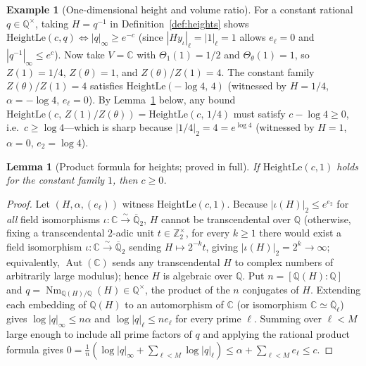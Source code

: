 \documentclass[11pt]{amsart}
\newcommand{\CC}{\mathbb{C}}
\newcommand{\QQ}{\mathbb{Q}}
\newcommand{\ZZ}{\mathbb{Z}}
\newcommand{\Nm}{\operatorname{Nm}}
\newtheorem{lemma}[theorem]{Lemma}
\theoremstyle{definition}
\newtheorem{example}[theorem]{Example}
\theoremstyle{remark}
\begin{document}
\begin{example}[One-dimensional height and volume ratio]\label{ex:height_toy}
For a constant rational $q\in\QQ^\times$, taking $H=q^{-1}$ in Definition~\ref{def:heights} shows $\mathrm{HeightLe}(c,q)\iff |q|_\infty\ge e^{-c}$ (since $|H y_\iota|_\ell=|1|_\ell=1$ allows $e_\ell=0$ and $|q^{-1}|_\infty\le e^c$). Now take $V=\CC$ with $\Theta_1(1)=1/2$ and $\Theta_\theta(1)=1$, so $Z(1)=1/4$, $Z(\theta)=1$, and $Z(\theta)/Z(1)=4$. The constant family $Z(\theta)/Z(1)=4$ satisfies $\mathrm{HeightLe}(-\log 4,\,4)$ (witnessed by $H=1/4$, $\alpha=-\log 4$, $e_\ell=0$). By Lemma~\ref{lem:prod_formula} below, any bound $\mathrm{HeightLe}(c,\,Z(1)/Z(\theta))=\mathrm{HeightLe}(c,\,1/4)$ must satisfy $c-\log 4\ge 0$, i.e.\ $c\ge\log 4$---which is sharp because $|1/4|_2=4=e^{\log 4}$ (witnessed by $H=1$, $\alpha=0$, $e_2=\log 4$).
\end{example}

\begin{lemma}[Product formula for heights; proved in full]\label{lem:prod_formula}
If $\mathrm{HeightLe}(c,1)$ holds for the constant family $1$, then $c\ge 0$.
\end{lemma}
\begin{proof}
Let $(H,\alpha,(e_\ell))$ witness $\mathrm{HeightLe}(c,1)$. Because $|\iota(H)|_2\le e^{e_2}$ for \emph{all} field isomorphisms $\iota\colon\CC\xrightarrow{\sim}\overline{\QQ}_2$, $H$ cannot be transcendental over $\QQ$ (otherwise, fixing a transcendental $2$-adic unit $t\in\ZZ_2^\times$, for every $k\ge 1$ there would exist a field isomorphism $\iota\colon\CC\xrightarrow{\sim}\overline{\QQ}_2$ sending $H\mapsto 2^{-k}t$, giving $|\iota(H)|_2=2^k\to\infty$; equivalently, $\operatorname{Aut}(\CC)$ sends any transcendental $H$ to complex numbers of arbitrarily large modulus); hence $H$ is algebraic over $\QQ$. Put $n=[\QQ(H):\QQ]$ and $q=\Nm_{\QQ(H)/\QQ}(H)\in\QQ^\times$, the product of the $n$ conjugates of $H$. Extending each embedding of $\QQ(H)$ to an automorphism of $\CC$ (or isomorphism $\CC\simeq\overline{\QQ}_\ell$) gives $\log|q|_\infty\le n\alpha$ and $\log|q|_\ell\le n e_\ell$ for every prime $\ell$. Summing over $\ell<M$ large enough to include all prime factors of $q$ and applying the rational product formula gives $0=\frac1n(\log|q|_\infty+\sum_{\ell<M}\log|q|_\ell)\le\alpha+\sum_{\ell<M}e_\ell\le c$.
\end{proof}
\end{document}
